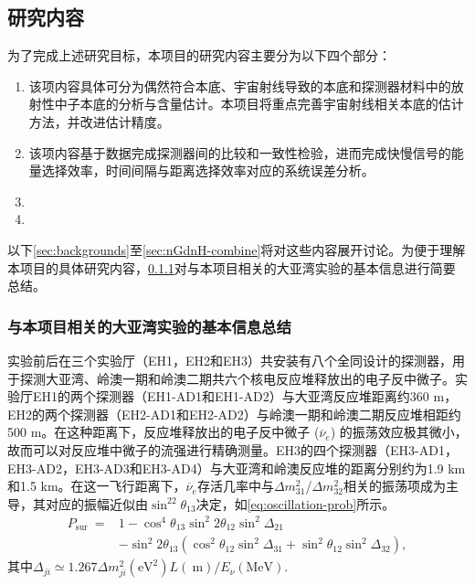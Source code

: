 \documentclass[a4paper,zihao=-4]{article}
\begin{document}
\subsection{研究内容}

为了完成上述研究目标，本项目的研究内容主要分为以下四个部分：
\begin{enumerate}
	\item {}该项内容具体可分为偶然符合本底、宇宙射线导致的本底和探测器材料中的放射性中子本底的分析与含量估计。本项目将重点完善宇宙射线相关本底的估计方法，并改进估计精度。
	\item {}该项内容基于数据完成探测器间的比较和一致性检验，进而完成快慢信号的能量选择效率，时间间隔与距离选择效率对应的系统误差分析。
	\item {}
	\item {}
\end{enumerate}
	
以下\cref{sec:backgrounds}至\cref{sec:nGdnH-combine}将对这些内容展开讨论。为便于理解本项目的具体研究内容，\cref{sec:dayabay-basic}对与本项目相关的大亚湾实验的基本信息进行简要总结。

\subsubsection{与本项目相关的大亚湾实验的基本信息总结}\label{sec:dayabay-basic}
实验前后在三个实验厅（EH1，EH2和EH3）共安装有八个全同设计的探测器，用于探测大亚湾、岭澳一期和岭澳二期共六个核电反应堆释放出的电子反中微子。实验厅EH1的两个探测器（EH1-AD1和EH1-AD2）与大亚湾反应堆距离约360 m，EH2的两个探测器（EH2-AD1和EH2-AD2）与岭澳一期和岭澳二期反应堆相距约500 m。在这种距离下，反应堆释放出的电子反中微子 ($\overline{\nu}_e$) 的振荡效应极其微小，故而可以对反应堆中微子的流强进行精确测量。EH3的四个探测器（EH3-AD1，EH3-AD2，EH3-AD3和EH3-AD4）与大亚湾和岭澳反应堆的距离分别约为1.9 km和1.5 km。在这一飞行距离下，$\overline{\nu}_e$存活几率中与$\Delta m_{31}^2$/$\Delta m_{32}^2$相关的振荡项成为主导，其对应的振幅近似由$\sin^22\theta_{13}$决定，如\cref{eq:oscillation-prob}所示。
\begin{equation}\label{eq:oscillation-prob}
	\begin{aligned}
P_{\text {sur }}= & 1-\cos ^4 \theta_{13} \sin ^2 2 \theta_{12} \sin ^2 \Delta_{21} \\
& -\sin ^2 2 \theta_{13}\left(\cos ^2 \theta_{12} \sin ^2 \Delta_{31}+\sin ^2 \theta_{12} \sin ^2 \Delta_{32}\right),
\end{aligned}
\end{equation}
其中$\Delta_{j i} \simeq 1.267 \Delta m_{j i}^2\left(\mathrm{eV}^2\right) L(\mathrm{~m}) / E_\nu(\mathrm{MeV})$. 
\end{document}
